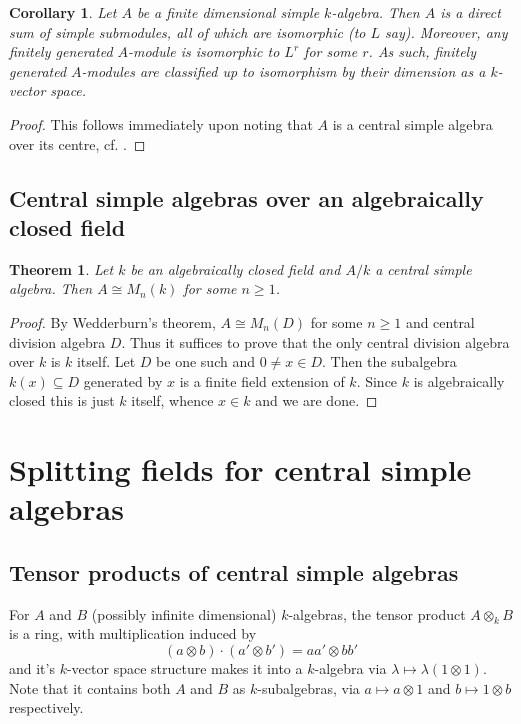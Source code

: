 \documentclass[11pt]{amsart}
\numberwithin{equation}{section}
\newtheorem{theorem}[equation]{Theorem}
\newtheorem{cor}[equation]{Corollary}
\theoremstyle{remark}
\theoremstyle{remark}
\theoremstyle{remark}
\theoremstyle{definition}
\theoremstyle{definition}
\theoremstyle{definition}
\theoremstyle{definition}
\theoremstyle{definition}
\theoremstyle{definition}
\begin{document}
\begin{cor} \label{modules over CSAs}
Let $A$ be a finite dimensional simple $k$-algebra. Then $A$ is a direct sum of simple submodules, all of which are isomorphic (to $L$ say). Moreover, any finitely generated $A$-module is isomorphic to $L^r$ for some $r$. As such, finitely generated $A$-modules are classified up to isomorphism by their dimension as a $k$-vector space.
\end{cor}

\begin{proof}
This follows immediately upon noting that $A$ is a central simple algebra over its centre, cf. .
\end{proof}

\subsection{Central simple algebras over an algebraically closed field}

\begin{theorem} \label{over alg closed field}
Let $k$ be an algebraically closed field and $A/k$ a central simple algebra. Then $A\cong M_n(k)$ for some $n\geq 1$.
\end{theorem}

\begin{proof}
By Wedderburn's theorem, $A\cong M_n(D)$ for some $n\geq 1$ and central division algebra $D$. Thus it suffices to prove that the only central division algebra over $k$ is $k$ itself. Let $D$ be one such and $0\neq x\in D$. Then the subalgebra $k(x)\subseteq D$ generated by $x$ is a finite field extension of $k$. Since $k$ is algebraically closed this is just $k$ itself, whence $x\in k$ and we are done. 
\end{proof}



\section{Splitting fields for central simple algebras}

\subsection{Tensor products of central simple algebras}

For $A$ and $B$ (possibly infinite dimensional) $k$-algebras, the tensor product $A\otimes_k B$ is a ring, with multiplication induced by
\[(a\otimes b)\cdot (a'\otimes b')=aa'\otimes bb'\]
and it's $k$-vector space structure makes it into a $k$-algebra via $\lambda \mapsto \lambda (1\otimes 1)$. Note that it contains both $A$ and $B$ as $k$-subalgebras, via $a\mapsto a\otimes 1$ and $b\mapsto 1\otimes b$ respectively. 
\end{document}
